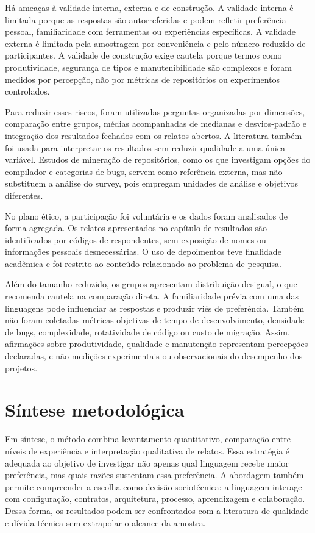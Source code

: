 Há ameaças à validade interna, externa e de construção. A validade interna é limitada porque as respostas são autorreferidas e podem refletir preferência pessoal, familiaridade com ferramentas ou experiências específicas. A validade externa é limitada pela amostragem por conveniência e pelo número reduzido de participantes. A validade de construção exige cautela porque termos como produtividade, segurança de tipos e manutenibilidade são complexos e foram medidos por percepção, não por métricas de repositórios ou experimentos controlados.

Para reduzir esses riscos, foram utilizadas perguntas organizadas por dimensões, comparação entre grupos, médias acompanhadas de medianas e desvios-padrão e integração dos resultados fechados com os relatos abertos. A literatura também foi usada para interpretar os resultados sem reduzir qualidade a uma única variável. Estudos de mineração de repositórios, como os que investigam opções do compilador e categorias de bugs, servem como referência externa, mas não substituem a análise do survey, pois empregam unidades de análise e objetivos diferentes.

No plano ético, a participação foi voluntária e os dados foram analisados de forma agregada. Os relatos apresentados no capítulo de resultados são identificados por códigos de respondentes, sem exposição de nomes ou informações pessoais desnecessárias. O uso de depoimentos teve finalidade acadêmica e foi restrito ao conteúdo relacionado ao problema de pesquisa.

Além do tamanho reduzido, os grupos apresentam distribuição desigual, o que recomenda cautela na comparação direta. A familiaridade prévia com uma das linguagens pode influenciar as respostas e produzir viés de preferência. Também não foram coletadas métricas objetivas de tempo de desenvolvimento, densidade de bugs, complexidade, rotatividade de código ou custo de migração. Assim, afirmações sobre produtividade, qualidade e manutenção representam percepções declaradas, e não medições experimentais ou observacionais do desempenho dos projetos.

\section{Síntese metodológica}

Em síntese, o método combina levantamento quantitativo, comparação entre níveis de experiência e interpretação qualitativa de relatos. Essa estratégia é adequada ao objetivo de investigar não apenas qual linguagem recebe maior preferência, mas quais razões sustentam essa preferência. A abordagem também permite compreender a escolha como decisão sociotécnica: a linguagem interage com configuração, contratos, arquitetura, processo, aprendizagem e colaboração. Dessa forma, os resultados podem ser confrontados com a literatura de qualidade e dívida técnica sem extrapolar o alcance da amostra.

